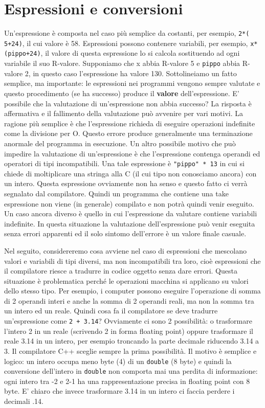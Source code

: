 \section{Espressioni e conversioni}
Un'espressione è composta nel caso più semplice da costanti, per esempio, \texttt{2*( 5+24)}, il cui valore è 58.
Espressioni possono contenere variabili, per esempio, \texttt{x*(pippo+24)}, il valore di questa espressione lo si calcola sostituendo ad ogni variabile il suo R-valore.
Supponiamo che x abbia R-valore 5 e \texttt{pippo} abbia R-valore 2, in questo caso l'espressione ha valore 130.
Sottolineiamo un fatto semplice, ma importante: le espressioni nei programmi vengono sempre valutate e questo procedimento (se ha successo) produce il \textbf{valore} dell'espressione.
E' possibile che la valutazione di un'espressione non abbia successo?
La risposta è affermativa e il fallimento della valutazione può avvenire per vari motivi.
La ragione più semplice è che l'espressione richieda di eseguire operazioni indefinite come la divisione per O.
Questo errore produce generalmente una terminazione anormale del programma in esecuzione.
Un altro possibile motivo che può impedire la valutazione di un'espressione è che l'espressione contenga operandi ed operatori di tipi incompatibili.
Una tale espressione è \texttt{"pippo" * 13} in cui si chiede di moltiplicare una stringa alla C (il cui tipo non conosciamo ancora) con un intero.
Questa espressione ovviamente non ha senso e questo fatto ci verrà segnalato dal compilatore.
Quindi un programma che contiene una take espressione non viene (in generale) compilato e non potrà quindi venir eseguito.
Un caso ancora diverso è quello in cui l'espressione da valutare contiene variabili indefinite.
In questa situazione la valutazione dell'espressione può venir eseguita senza errori apparenti ed il solo sintomo dell'errore è un valore finale casuale.

Nel seguito, considereremo cosa avviene nel caso di espressioni che mescolano valori e variabili di tipi diversi, ma non incompatibili tra loro, cioè espressioni che il compilatore riesce a tradurre in codice oggetto senza dare errori.
Questa situazione è problematica perché le operazioni macchina si applicano su valori dello stesso tipo.
Per esempio, i computer possono eseguire l'operazione di somma di 2 operandi interi e anche la somma di 2 operandi reali, ma non la somma tra un intero ed un reale.
Quindi cosa fa il compilatore se deve tradurre un'espressione come \texttt{2 + 3.14}?
Ovviamente ci sono 2 possibilità: o trasformare l'intero 2 in un reale (scrivendo 2 in forma floating point) oppure trasformare il reale 3.14 in un intero, per esempio troncando la parte decimale riducendo 3.14 a 3.
Il compilatore C++ sceglie sempre la prima possibilità.
Il motivo è semplice e logico: un intero occupa meno byte (4) di un \texttt{double} (8 byte) e quindi la conversione dell'intero in \texttt{double} non comporta mai una perdita di informazione: ogni intero tra -2 e 2-1 ha una rappresentazione precisa in floating point con 8 byte.
E' chiaro che invece trasformare 3.14 in un intero ci faccia perdere i decimali .14.

